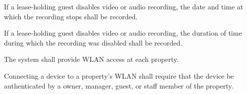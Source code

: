 \documentclass[letter,titlepage,oneside,english]{report}
\begin{document}
\begin{fr}
\begin{fr}
    \begin{fr}
    \item
      If a lease-holding guest disables video or audio recording, the date and time at which the recording stops shall be recorded.
    \item
      If a lease-holding guest disables video or audio recording, the duration of time during which the recording was disabled shall be recorded.
    \end{fr}
  \end{fr}
\item
  The system shall provide WLAN access at each property.
  \begin{fr}
  \item
    Connecting a device to a property's WLAN shall require that the device be authenticated by a owner, manager, guest, or staff member of the property.
  \end{fr}
\end{fr}
\end{document}
